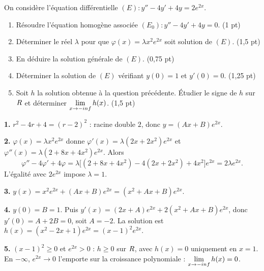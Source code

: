 \begin{commeaubac}
On considère l'équation différentielle
$(E) : y'' - 4y' + 4y = 2e^{2x}$.

\begin{enumerate}[label=\textbf{\arabic*.}, leftmargin=*, itemsep=0.25em]
  \item Résoudre l'équation homogène associée $(E_{0}) : y''-4y'+4y = 0$.
        \hfill\textup{(1 pt)}
  \item Déterminer le réel $\lambda$ pour que $\varphi(x) = \lambda x^{2}e^{2x}$
        soit solution de $(E)$. \hfill\textup{(1,5 pt)}
  \item En déduire la solution générale de $(E)$. \hfill\textup{(0,75 pt)}
  \item Déterminer la solution de $(E)$ vérifiant $y(0) = 1$ et $y'(0) = 0$.
        \hfill\textup{(1,25 pt)}
  \item Soit $h$ la solution obtenue à la question précédente. Étudier le signe
        de $h$ sur $R$ et déterminer $\limminf h(x)$.
        \hfill\textup{(1,5 pt)}
\end{enumerate}
\end{commeaubac}

\begin{corrige}
\textbf{1.} $r^{2}-4r+4 = (r-2)^{2}$ : racine double $2$, donc
$y = (Ax+B)e^{2x}$.

\textbf{2.} $\varphi(x) = \lambda x^{2}e^{2x}$ donne
$\varphi'(x) = \lambda(2x+2x^{2})e^{2x}$ et
$\varphi''(x) = \lambda(2+8x+4x^{2})e^{2x}$. Alors
\[
  \varphi''-4\varphi'+4\varphi
  = \lambda\bigl[(2+8x+4x^{2}) - 4(2x+2x^{2}) + 4x^{2}\bigr]e^{2x}
  = 2\lambda e^{2x}.
\]
L'égalité avec $2e^{2x}$ impose $\lambda = 1$.

\textbf{3.} $y(x) = x^{2}e^{2x} + (Ax+B)e^{2x} = \left(x^{2}+Ax+B\right)e^{2x}$.

\textbf{4.} $y(0) = B = 1$. Puis
$y'(x) = \left(2x+A\right)e^{2x} + 2\left(x^{2}+Ax+B\right)e^{2x}$, donc
$y'(0) = A + 2B = 0$, soit $A = -2$. La solution est
$h(x) = \left(x^{2}-2x+1\right)e^{2x} = (x-1)^{2}e^{2x}$.

\textbf{5.} $(x-1)^{2} \geq 0$ et $e^{2x}>0$ : $h \geq 0$ sur $R$, avec
$h(x) = 0$ uniquement en $x=1$. En $-\infty$, $e^{2x} \to 0$ l'emporte sur la
croissance polynomiale : $\limminf h(x) = 0$.
\end{corrige}

